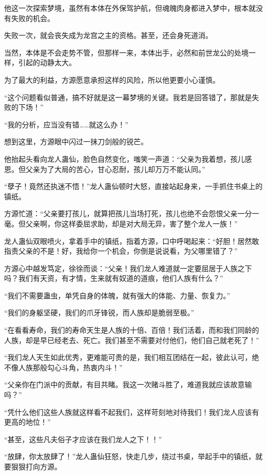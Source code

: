 \begin{this_body}
他这一次探索梦境，虽然有本体在外保驾护航，但魂魄肉身都进入梦中，根本就没有失败的机会。

失败一次，就会丧失成为龙宫之主的资格。甚至，还会身死道消。

当然，本体是不会走势不管，但那样一来，本体出手，必然和前世龙公的处境一样，引起的动静太大。

为了最大的利益，方源愿意承担这样的风险，所以他更要小心谨慎。

“这个问题看似普通，搞不好就是这一幕梦境的关键。我若是回答错了，那就是失败的下场！”

“我的分析，应当没有错……就这么办！”

想到这里，方源眼中闪过一抹刀剑般的锐芒。

他抬起头看向龙人蛊仙，脸色自然变化，嗤笑一声道：“父亲为我着想，孩儿感恩。但父亲为了大局的苦心，甘心忍耐，孩儿却万万不能认同。”

“孽子！竟然还执迷不悟！”龙人蛊仙顿时大怒，直接站起身来，一手抓住书桌上的镇纸。

方源忙道：“父亲要打孩儿，就算把孩儿当场打死，孩儿也绝不会怨恨父亲一分一毫。但父亲啊，你这样委屈求助，却是对大局无异，害了整个龙人一族！”

龙人蛊仙双眼喷火，拿着手中的镇纸，指着方源，口中呼喝起来：“好胆！居然敢指责父亲的不是！好，我给你一个机会，你倒是说说看，为父哪里错了？”

方源心中越发笃定，徐徐而谈：“父亲！我们龙人难道就一定要屈居于人族之下吗？我们有天资，有才情，生来就有奴道的道痕，他们人族有什么？”

“我们不需要蛊虫，单凭自身的体魄，就有强大的体能、力量、恢复力。”

“我们的身躯坚硬，我们的爪牙锋锐，而人族却是脆弱至极。”

“在看看寿命，我们的寿命天生是人族的十倍、百倍！我们活着，而和我们同龄的人族，却是早已经老去、死亡。我们甚至不需要对付他们，他们自己就老死了！”

“我们龙人天生如此优秀，更难能可贵的是，我们相互团结在一起，彼此认可，绝不像人族那般勾心斗角，热衷内斗！”

“父亲你在门派中的贡献，有目共睹。我这一次赌斗胜了，难道我就应该故意输吗？”

“凭什么他们这些人族就这样看不起我们，这样苛刻地对待我们！我们龙人应该有更高的地位！”

“甚至，这些凡夫俗子才应该在我们龙人之下！！”

“放肆，你太放肆了！”龙人蛊仙狂怒，快走几步，绕过书桌，举起手中的镇纸，就要狠狠打向方源。


\end{this_body}
